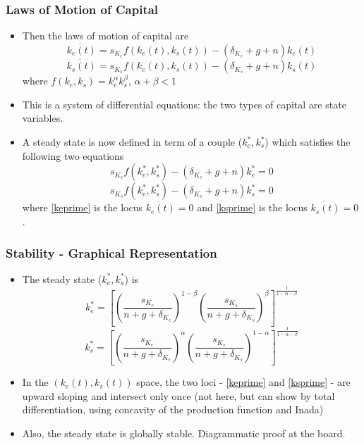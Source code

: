 \documentclass[11pt]{beamer}
\begin{document}

\begin{frame}
\frametitle{Laws of Motion of Capital}
\begin{itemize}\itemsep2ex
	\item Then the laws of motion of capital are
\begin{equation}
\dot{k_e(t)} = s_{K_e}f(k_e(t), k_s(t))  - ( \delta_{K_e} + g + n) k_e(t)
\end{equation}
\begin{equation}
\dot{k_s(t)} = s_{K_s}f(k_e(t), k_s(t))  - ( \delta_{K_s} + g + n) k_s(t)
\end{equation}
where $f(k_e, k_s)=k_e^{\alpha} k_s^{\beta}$, $\alpha+\beta<1$
	\item This is a system of differential equations: the two types of capital are state variables.
	\item A steady state is now defined in term of a couple ($k^*_e,k^*_s$) which satisfies the following two equations
\begin{equation}
\label{keprime}
s_{K_e}f(k_e^*, k_s^*)  - ( \delta_{K_e} + g + n) k_e^* = 0
\end{equation}
\begin{equation}
\label{ksprime}
s_{K_s}f(k_e^*, k_s^*)  - ( \delta_{K_s} + g + n) k_s^* = 0
\end{equation}
where \eqref{keprime} is the locus $\dot{k_e(t)}=0$ and \eqref{ksprime} is the locus $\dot{k_s(t)}=0$.
\end{itemize}
\end{frame}


\begin{frame}
\frametitle{Stability - Graphical Representation}
\begin{itemize}\itemsep2ex
	\item The steady state ($k^*_e,k^*_s$) is
\begin{equation*}
k^*_e = \left [ \left (\frac{s_{K_e}}{n + g + \delta_{K_e}} \right )^{1-\beta} \left (\frac{s_{K_s}}{n + g + \delta_{K_s}} \right )^{\beta}   \right ]^{\frac{1}{1-\alpha-\beta}}
\end{equation*}
\begin{equation*}
k^*_s = \left [ \left (\frac{s_{K_e}}{n + g + \delta_{K_e}} \right )^{\alpha} \left (\frac{s_{K_s}}{n + g + \delta_{K_s}} \right )^{1-\alpha}   \right ]^{\frac{1}{1-\alpha-\beta}}
\end{equation*}
	\item In the $(k_e(t),k_s(t))$ space, the two loci -  \eqref{keprime} and \eqref{ksprime} - are upward sloping and intersect only once (not here, but can show by total differentiation, using concavity of the production function and Inada)
	\item Also, the steady state is globally stable. Diagrammatic proof at the board.
\end{itemize}
\end{frame}
\end{document}
